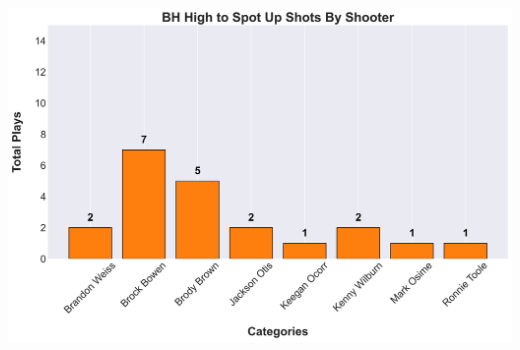 \documentclass[a4paper,12pt]{article}
\begin{document}
\begin{table}[H]
{\begin{minipage}[t]{0.6\textwidth}
{\begin{tabular}
            \bottomrule
        \end{tabular}
        } %
    \end{minipage}
    } %
    \hfill %
    \begin{minipage}[c]{0.35\textwidth} %
        \flushright
        \includegraphics[width=\textwidth, height=.14\textheight]{images/PNR_PassHighShotsPlayer_Freq.png} %
    \end{minipage}
\end{table}

\vspace{-1em} %
\vspace{-1em} %
\end{document}
